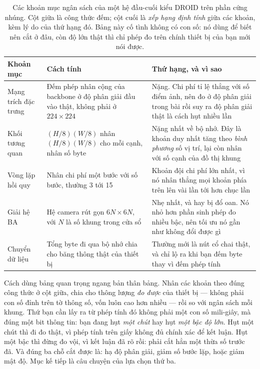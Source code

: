 \documentclass[../../deep_learning.tex]{subfiles}
\begin{document}
\begin{table}[H]\centering\footnotesize
\caption{Các khoản mục ngân sách của một hệ đầu-cuối kiểu DROID trên phần cứng nhúng. Cột giữa là công thức đếm; cột cuối là \emph{xếp hạng định tính} giữa các khoản, kèm lý do của thứ hạng đó. Bảng này cố tình không có con số: nó dùng để biết nên cắt ở đâu, còn độ lớn thật thì chỉ phép đo trên chính thiết bị của bạn mới nói được.}
\label{tab:f31-ngan-sach}
\begin{tabularx}{\linewidth}{@{}L{3.2cm}YL{4.6cm}@{}}
\toprule
\textbf{Khoản mục} & \textbf{Cách tính} & \textbf{Thứ hạng, và vì sao}\\
\midrule
Mạng trích đặc trưng & Đếm phép nhân cộng của backbone ở độ phân giải đầu vào thật, không phải ở \(224\times224\) & Nặng. Chi phí tỉ lệ thẳng với số điểm ảnh, nên đo ở độ phân giải trong bài rồi suy ra độ phân giải thật là cách hụt nhiều lần\\
Khối tương quan & \((H/8)(W/8)\) nhân \((H/8)(W/8)\) cho mỗi cạnh, nhân số byte & Nặng nhất về bộ nhớ. Đây là khoản duy nhất tăng theo \emph{bình phương} số vị trí, lại còn nhân với số cạnh của đồ thị khung\\
Vòng lặp hồi quy & Nhân chi phí một bước với số bước, thường 3 tới 15 & Khoản đội chi phí lớn nhất, vì nó nhân thẳng mọi khoản phía trên lên vài lần tới hơn chục lần\\
Giải hệ BA & Hệ camera rút gọn \(6N\times6N\), với \(N\) là số khung trong cửa sổ & Nhẹ nhất, và hay bị đổ oan. Nó nhỏ hơn phần sinh phép đo nhiều bậc, nên tối ưu nó gần như không đổi được gì\\
Chuyển dữ liệu & Tổng byte đi qua bộ nhớ chia cho băng thông thật của thiết bị & Thường mới là nút cổ chai thật, và chỉ lộ ra khi bạn đếm byte thay vì đếm phép tính\\
\bottomrule
\end{tabularx}
\end{table}

Cách dùng bảng quan trọng ngang bản thân bảng. Nhân các khoản theo đúng công thức ở cột giữa, chia cho thông lượng \emph{đo được} của thiết bị --- không phải con số đỉnh trên tờ thông số, vốn luôn cao hơn nhiều --- rồi so với ngân sách mỗi khung. Thứ bạn cần lấy ra từ phép tính đó không phải một con số mili-giây, mà đúng một bit thông tin: bạn đang hụt \emph{một chút} hay hụt \emph{một bậc độ lớn}. Hụt một chút thì đi đo thật, vì phép tính trên giấy không đủ chính xác để kết luận. Hụt một bậc thì đừng đo vội, vì kết luận đã rõ rồi: phải cắt hẳn một thừa số trước đã. Và đúng ba chỗ cắt được là: hạ độ phân giải, giảm số bước lặp, hoặc giảm mật độ. Mục kế tiếp là câu chuyện của lựa chọn thứ ba.
\end{document}
